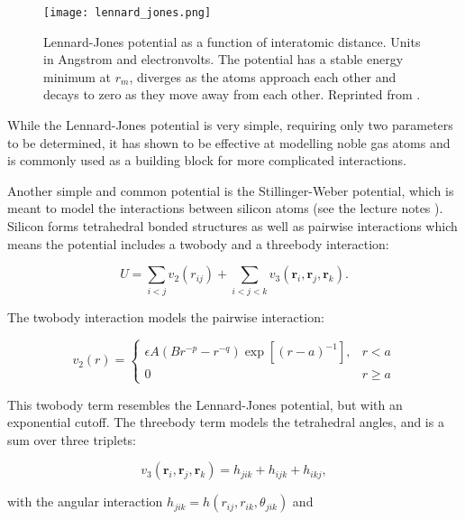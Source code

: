 \begin{figure}[H]
    \centering
    \texttt{[image: lennard\_jones.png]}
    \caption{Lennard-Jones potential as a function of interatomic distance.
        Units in Angstrom and electronvolts.
        The potential has a stable energy minimum at $r_m$, diverges
        as the atoms approach each other and decays to zero as they
        move away from each other.
        Reprinted from \parencite[Molecular dynamics modelling of clay-fluid interfaces]
            {phdthesis}.}
    \label{fig:lennard-jones}
\end{figure}

\par
While the Lennard-Jones potential is very simple, requiring only two parameters
to be determined, it has shown to be effective at modelling noble gas atoms
and is commonly used as a building block for more complicated interactions.
\par
Another simple and common potential is the Stillinger-Weber potential,
which is meant to model the interactions between silicon atoms
(see the lecture notes \parencite[Abrams, Cameron]{che8002013}).
Silicon forms tetrahedral bonded structures as well as pairwise interactions
which means the potential includes a twobody and a threebody interaction:

\begin{equation}
    U = \sum_{i < j} v_2(r_{ij}) + \sum_{i < j < k} v_3(\bm{r}_i, \bm{r}_j, \bm{r}_k) .
\end{equation}

The twobody interaction models the pairwise interaction:

\begin{equation}
    v_2(r) =
    \begin{cases}
        \epsilon A (Br^{-p} - r^{-q}) \exp \left[ (r - a)^{-1} \right],
        & r < a \\
        0 & r \geq a
    \end{cases}
\end{equation}

This twobody term resembles the Lennard-Jones potential,
but with an exponential cutoff.
The threebody term models the tetrahedral angles,
and is a sum over three triplets:

\begin{equation}
    v_3(\bm{r}_i, \bm{r}_j, \bm{r}_k) = h_{jik} + h_{ijk} + h_{ikj} ,
\end{equation}

with the angular interaction $h_{jik} = h(r_{ij}, r_{ik}, \theta_{jik})$ and

